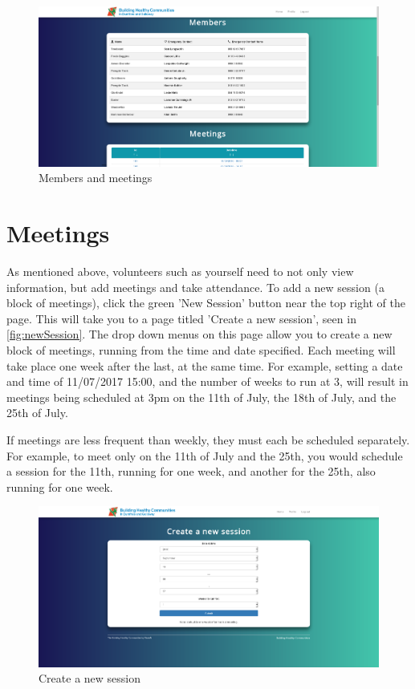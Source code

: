 \documentclass{bhcguides}
\begin{document}
\begin{figure}[h]
 \centerline{\includegraphics[width=\textwidth, height=\textheight, keepaspectratio]{membersandmeetings.png}}
 \caption{Members and meetings}
 \label{fig:memsandmeets}
\end{figure}

\pagebreak

\section{Meetings}
\label{sec:meetings}

As mentioned above, volunteers such as yourself need to not only view information, but add meetings and take attendance. To add a new session (a block of meetings), click the green 'New Session' button near the top right of the page. This will take you to a page titled 'Create a new session', seen in \autoref{fig:newSession}. The drop down menus on this page allow you to create a new block of meetings, running from the time and date specified. Each meeting will take place one week after the last, at the same time. For example, setting a date and time of 11/07/2017 15:00, and the number of weeks to run at 3, will result in meetings being scheduled at 3pm on the 11th of July, the 18th of July, and the 25th of July. 

If meetings are less frequent than weekly, they must each be scheduled separately. For example, to meet only on the 11th of July and the 25th, you would schedule a session for the 11th, running for one week, and another for the 25th, also running for one week.

\begin{figure}[h]
 \centerline{\includegraphics[width=\textwidth, height=\textheight, keepaspectratio]{newsession.png}}
 \caption{Create a new session}
 \label{fig:newSession}
\end{figure}
\end{document}
